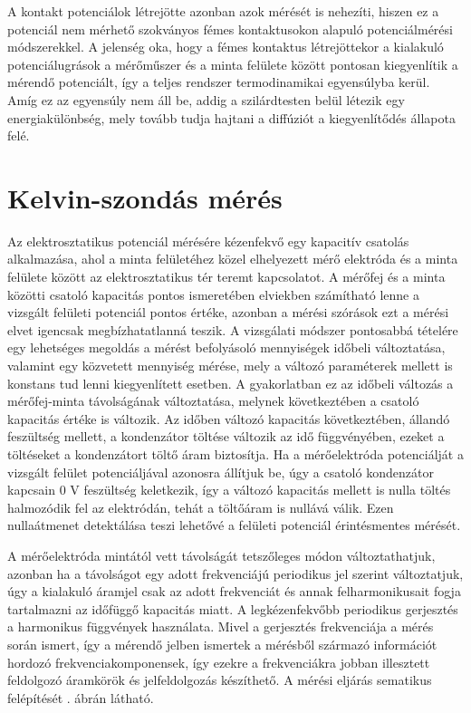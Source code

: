A kontakt potenciálok létrejötte azonban azok mérését is nehezíti, hiszen ez a potenciál nem mérhető szokványos fémes kontaktusokon alapuló potenciálmérési módszerekkel. A jelenség oka, hogy a fémes kontaktus létrejöttekor a kialakuló potenciálugrások a mérőműszer és a minta felülete között pontosan kiegyenlítik a mérendő potenciált, így a teljes rendszer termodinamikai egyensúlyba kerül. Amíg ez az egyensúly nem áll be, addig a szilárdtesten belül létezik egy energiakülönbség, mely tovább tudja hajtani a diffúziót a kiegyenlítődés állapota felé.

\section{Kelvin-szondás mérés}

Az elektrosztatikus potenciál mérésére kézenfekvő egy kapacitív csatolás alkalmazása, ahol a minta felületéhez közel elhelyezett mérő elektróda és a minta felülete között az elektrosztatikus tér teremt kapcsolatot. A mérőfej és a minta közötti csatoló kapacitás pontos ismeretében elviekben számítható lenne a vizsgált felületi potenciál pontos értéke, azonban a mérési szórások ezt a mérési elvet igencsak megbízhatatlanná teszik. A vizsgálati módszer pontosabbá tételére egy lehetséges megoldás a mérést befolyásoló mennyiségek időbeli változtatása, valamint egy közvetett mennyiség mérése, mely a változó paraméterek mellett is konstans tud lenni kiegyenlített esetben. A gyakorlatban ez az időbeli változás a mérőfej-minta távolságának változtatása, melynek következtében a csatoló kapacitás értéke is változik. Az időben változó kapacitás következtében, állandó feszültség mellett, a kondenzátor töltése változik az idő függvényében, ezeket a töltéseket a kondenzátort töltő áram biztosítja. Ha a mérőelektróda potenciálját a vizsgált felület potenciáljával azonosra állítjuk be, úgy a csatoló kondenzátor kapcsain 0 V feszültség keletkezik, így a változó kapacitás mellett is nulla töltés halmozódik fel az elektródán, tehát a töltőáram is nullává válik. Ezen nullaátmenet detektálása teszi lehetővé a felületi potenciál érintésmentes mérését.

A mérőelektróda mintától vett távolságát tetszőleges módon változtathatjuk, azonban ha a távolságot egy adott frekvenciájú periodikus jel szerint változtatjuk, úgy a kialakuló áramjel csak az adott frekvenciát és annak felharmonikusait fogja tartalmazni az időfüggő kapacitás miatt. A legkézenfekvőbb periodikus gerjesztés a harmonikus függvények használata. Mivel a gerjesztés frekvenciája a mérés során ismert, így a mérendő jelben ismertek a mérésből származó információt hordozó frekvenciakomponensek, így ezekre a frekvenciákra jobban illesztett feldolgozó áramkörök és jelfeldolgozás készíthető. A mérési eljárás sematikus felépítését  . ábrán látható.

